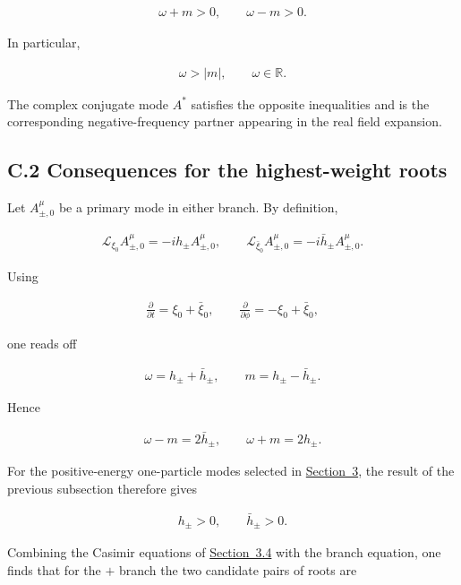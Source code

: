 \begin{align}
\omega + m > 0,
\qquad
\omega - m > 0.
\end{align}

In particular,

\begin{align}
\omega > |m|,
\qquad
\omega \in \mathbb{R}.
\end{align}

The complex conjugate mode $A^{*}$ satisfies the opposite inequalities and is the corresponding negative-frequency partner appearing in the real field expansion.

\subsection{C.2 Consequences for the highest-weight roots}\label{subsec:highest-weight-root-consequences}

Let $A_{\pm,0}^{\mu}$ be a primary mode in either branch. By definition,

\begin{align}
\mathcal{L}_{\xi_{0}} A_{\pm,0}^{\mu} = - i h_{\pm} A_{\pm,0}^{\mu},
\qquad
\mathcal{L}_{\bar{\xi}_{0}} A_{\pm,0}^{\mu} = - i \bar{h}_{\pm} A_{\pm,0}^{\mu}.
\end{align}

Using

\begin{align}
\frac{\partial}{\partial t} = \xi_{0} + \bar{\xi}_{0},
\qquad
\frac{\partial}{\partial \phi} = - \xi_{0} + \bar{\xi}_{0},
\end{align}

one reads off

\begin{align}
\omega = h_{\pm} + \bar{h}_{\pm},
\qquad
m = h_{\pm} - \bar{h}_{\pm}.
\end{align}

Hence

\begin{align}
\omega - m = 2 \bar{h}_{\pm},
\qquad
\omega + m = 2 h_{\pm}.
\end{align}

For the positive-energy one-particle modes selected in \hyperref[sec:quantization]{Section~3}, the result of the previous subsection therefore gives

\begin{align}
h_{\pm} > 0,
\qquad
\bar{h}_{\pm} > 0.
\end{align}

Combining the Casimir equations of \hyperref[subsec:solving-modes]{Section~3.4} with the branch equation, one finds that for the $+$ branch the two candidate pairs of roots are

